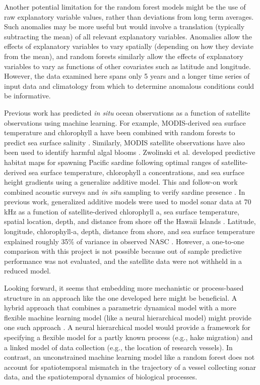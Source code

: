 \documentclass[10pt,letterpaper]{article}
\begin{document}
Another potential limitation for the random forest models might be the use of raw explanatory variable values, rather than deviations from long term averages.
Such anomalies may be more useful but would involve a translation (typically subtracting the mean) of all relevant explanatory variables.
Anomalies allow the effects of explanatory variables to vary spatially (depending on how they deviate from the mean), and random forests similarly allow the effects of explanatory variables to vary as functions of other covariates such as latitude and longitude.
However, the data examined here spans only 5 years and a longer time series of input data and climatology from which to determine anomalous conditions could be informative.

Previous work has predicted \emph{in situ} ocean observations as a function of satellite observations using machine learning.
For example, MODIS-derived sea surface temperature and chlorophyll a have been combined with random forests to predict sea surface salinity \cite{liu2015multivariable}.
Similarly, MODIS satellite observations have also been used to identify harmful algal blooms \cite{song2015learning}.
Zwolinski et al. \cite{zwolinski2011predicting} developed predictive habitat maps for spawning Pacific sardine following optimal ranges of satellite-derived sea surface temperature, chlorophyll a concentrations, and sea surface height gradients using a generalize additive model. This and follow-on work combined acoustic surveys and \emph{in situ} sampling to verify sardine presence \cite{zwolinski2011predicting, demer2014corroboration}.
In previous work, generalized additive models were used to model sonar data at 70 kHz as a function of satellite-derived chlorophyll a, sea surface temperature, spatial location, depth, and distance from shore off the Hawaii Islands \cite{copeland2016influences}.
Latitude, longitude, chlorophyll-a, depth, distance from shore, and sea surface temperature explained roughly 35\% of variance in observed NASC \cite{copeland2016influences}.
However, a one-to-one comparison with this project is not possible because out of sample predictive performance was not evaluated, and the satellite data were not withheld in a reduced model.

Looking forward, it seems that embedding more mechanistic or process-based structure in an approach like the one developed here might be beneficial.
A hybrid approach that combines a parametric dynamical model with a more flexible machine learning model (like a neural hierarchical model) might provide one such approach \cite{joseph2020}.
A neural hierarchical model would provide a framework for specifying a flexible model for a partly known process (e.g., hake migration) and a linked model of data collection (e.g., the location of research vessels).
In contrast, an unconstrained machine learning model like a random forest does not account for spatiotemporal mismatch in the trajectory of a vessel collecting sonar data, and the spatiotemporal dynamics of biological processes.
\end{document}
